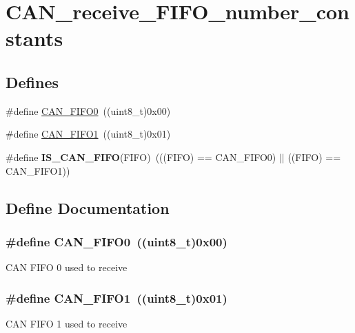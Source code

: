 \hypertarget{group__CAN__receive__FIFO__number__constants}{
\section{CAN\_\-receive\_\-FIFO\_\-number\_\-constants}
\label{group__CAN__receive__FIFO__number__constants}
}
\subsection*{Defines}
\begin{DoxyCompactItemize}
\item 
\#define \hyperlink{group__CAN__receive__FIFO__number__constants_ga8f52eeefb86b2af5b7c3b4b75fa4d114}{CAN\_\-FIFO0}~((uint8\_\-t)0x00)
\item 
\#define \hyperlink{group__CAN__receive__FIFO__number__constants_gafbcf3f13dbf61030ab7a812595ba9850}{CAN\_\-FIFO1}~((uint8\_\-t)0x01)
\item 
\hypertarget{group__CAN__receive__FIFO__number__constants_gaeeb94bf58bd48b8928f964eaaa20a24a}{
\#define {\bfseries IS\_\-CAN\_\-FIFO}(FIFO)~(((FIFO) == CAN\_\-FIFO0) $|$$|$ ((FIFO) == CAN\_\-FIFO1))}
\label{group__CAN__receive__FIFO__number__constants_gaeeb94bf58bd48b8928f964eaaa20a24a}

\end{DoxyCompactItemize}


\subsection{Define Documentation}
\hypertarget{group__CAN__receive__FIFO__number__constants_ga8f52eeefb86b2af5b7c3b4b75fa4d114}{
\subsubsection[{CAN\_\-FIFO0}]{\setlength{\rightskip}{0pt plus 5cm}\#define CAN\_\-FIFO0~((uint8\_\-t)0x00)}}
\label{group__CAN__receive__FIFO__number__constants_ga8f52eeefb86b2af5b7c3b4b75fa4d114}
CAN FIFO 0 used to receive \hypertarget{group__CAN__receive__FIFO__number__constants_gafbcf3f13dbf61030ab7a812595ba9850}{
\subsubsection[{CAN\_\-FIFO1}]{\setlength{\rightskip}{0pt plus 5cm}\#define CAN\_\-FIFO1~((uint8\_\-t)0x01)}}
\label{group__CAN__receive__FIFO__number__constants_gafbcf3f13dbf61030ab7a812595ba9850}
CAN FIFO 1 used to receive 